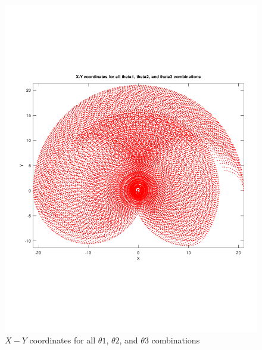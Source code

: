 \documentclass[11pt]{article}
\begin{document}
\begin{figure}
\caption{$X - Y$ coordinates for all $\theta 1$, $\theta 2$, and $\theta 3$ combinations}
\centering
\includegraphics[width=\textwidth]{Inverse Kinematics.pdf} 
\end{figure}

 
\end{document}
